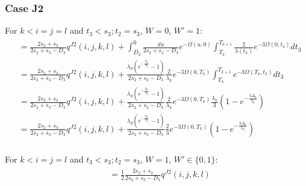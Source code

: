 \documentclass{article}
\begin{document}
\subsubsection{Case J2}
For $k<i=j=l$ and $t_3<s_3;t_2=s_3$, $W = 0$, $W' = 1$:
\begin{align}
    \begin{split}
        &=\frac{2s_2+s_3}{2s_2+s_3-D_3}q^{J2}(i,j,k,l)+\int_{D_3}^{0}\frac{du}{2s_3+s_2-D_3}e^{-\Omega(u,0)}\int_{T_k}^{T_{k+1}}\frac{2}{\lambda(t_3)}e^{-3\Omega(0,t_3)}dt_3\\
        &=\frac{2s_2+s_3}{2s_2+s_3-D_3}q^{J2}(i,j,k,l)+\frac{\lambda_d\left(e^{-\frac{D_3}{\lambda_d}}-1\right)}{2s_2+s_3-D_3}\frac{2}{\lambda_k}e^{-3\Omega(0,T_k)}\int_{T_k}^{T_{k+1}}e^{-3\Omega(T_k,t_3)}dt_3\\
        &=\frac{2s_2+s_3}{2s_2+s_3-D_3}q^{J2}(i,j,k,l)+\frac{\lambda_d\left(e^{-\frac{D_3}{\lambda_d}}-1\right)}{2s_2+s_3-D_3}\frac{2}{\lambda_k}e^{-3\Omega(0,T_k)}\frac{\lambda_k}{3}\left(1-e^{-\frac{3\Delta_k}{\lambda_k}}\right)\\
        &=\frac{2s_2+s_3}{2s_2+s_3-D_3}q^{J2}(i,j,k,l)+\frac{\lambda_d\left(e^{-\frac{D_3}{\lambda_d}}-1\right)}{2s_2+s_3-D_3}\frac{2}{3}e^{-3\Omega(0,T_k)}\left(1-e^{-\frac{3\Delta_k}{\lambda_k}}\right)\\
    \end{split}
\end{align}

For $k<i=j=l$ and $t_3<s_3;t_2=s_3$, $W = 1$, $W' \in \{0,1\}$:
\begin{align}
    \begin{split}
        &=\frac{1}{2}\frac{2s_2+s_3}{2s_2+s_3-D_3}q^{J2}(i,j,k,l)
    \end{split}
\end{align}
\end{document}
